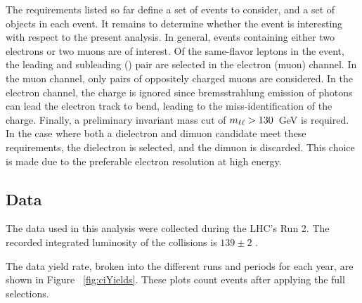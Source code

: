 The requirements listed so far define a set of events to consider, and a set of objects in each event.
It remains to determine whether the event is interesting with respect to the present analysis.
In general, events containing either two electrons or two muons are of interest.
Of the same-flavor leptons in the event, the leading and subleading \et (\pt) pair are selected in the electron (muon) channel.
In the muon channel, only pairs of oppositely charged muons are considered. 
In the electron channel, the charge is ignored since bremsstrahlung emission of photons can lead the electron track to bend, leading to the miss-identification of the charge.
Finally, a preliminary invariant mass cut of $m_{\ell\ell}>130$~GeV is required.
In the case where both a dielectron and dimuon candidate meet these requirements, the dielectron is selected, and the dimuon is discarded.
This choice is made due to the preferable electron \et resolution at high energy.

\subsection{Data}
The data used in this analysis were collected during the LHC's Run 2.
The recorded integrated luminosity of the collisions is $139\pm2$ \fb. \cite{ATLAS-CONF-2019-021}

The data yield rate, broken into the different runs and periods for each year, are shown in Figure ~\ref{fig:ciYields}.
These plots count events after applying the full selections.

